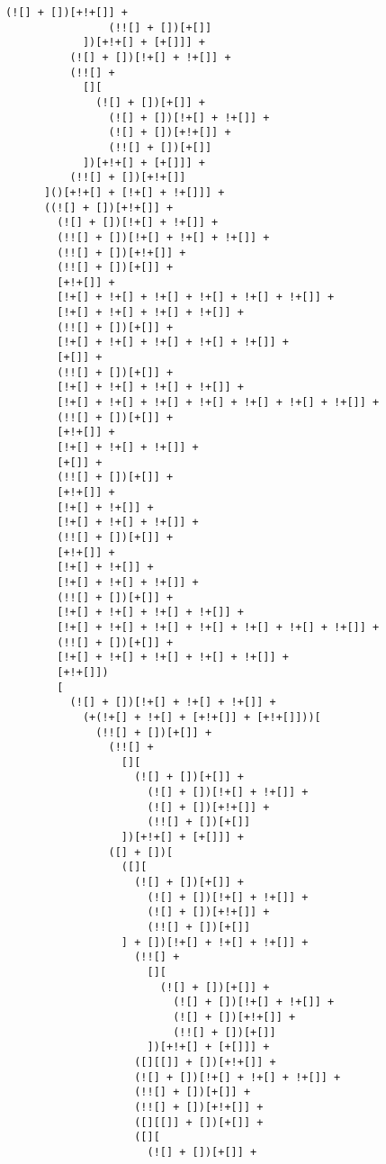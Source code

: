\begin{lstlisting}[style=basicStyle, caption=alert('XSS') in JSFuck, label={lst:alertxssjsfuck}]
                (![] + [])[+!+[]] +
                (!![] + [])[+[]]
            ])[+!+[] + [+[]]] +
          (![] + [])[!+[] + !+[]] +
          (!![] +
            [][
              (![] + [])[+[]] +
                (![] + [])[!+[] + !+[]] +
                (![] + [])[+!+[]] +
                (!![] + [])[+[]]
            ])[+!+[] + [+[]]] +
          (!![] + [])[+!+[]]
      ]()[+!+[] + [!+[] + !+[]]] +
      ((![] + [])[+!+[]] +
        (![] + [])[!+[] + !+[]] +
        (!![] + [])[!+[] + !+[] + !+[]] +
        (!![] + [])[+!+[]] +
        (!![] + [])[+[]] +
        [+!+[]] +
        [!+[] + !+[] + !+[] + !+[] + !+[] + !+[]] +
        [!+[] + !+[] + !+[] + !+[]] +
        (!![] + [])[+[]] +
        [!+[] + !+[] + !+[] + !+[] + !+[]] +
        [+[]] +
        (!![] + [])[+[]] +
        [!+[] + !+[] + !+[] + !+[]] +
        [!+[] + !+[] + !+[] + !+[] + !+[] + !+[] + !+[]] +
        (!![] + [])[+[]] +
        [+!+[]] +
        [!+[] + !+[] + !+[]] +
        [+[]] +
        (!![] + [])[+[]] +
        [+!+[]] +
        [!+[] + !+[]] +
        [!+[] + !+[] + !+[]] +
        (!![] + [])[+[]] +
        [+!+[]] +
        [!+[] + !+[]] +
        [!+[] + !+[] + !+[]] +
        (!![] + [])[+[]] +
        [!+[] + !+[] + !+[] + !+[]] +
        [!+[] + !+[] + !+[] + !+[] + !+[] + !+[] + !+[]] +
        (!![] + [])[+[]] +
        [!+[] + !+[] + !+[] + !+[] + !+[]] +
        [+!+[]])
        [
          (![] + [])[!+[] + !+[] + !+[]] +
            (+(!+[] + !+[] + [+!+[]] + [+!+[]]))[
              (!![] + [])[+[]] +
                (!![] +
                  [][
                    (![] + [])[+[]] +
                      (![] + [])[!+[] + !+[]] +
                      (![] + [])[+!+[]] +
                      (!![] + [])[+[]]
                  ])[+!+[] + [+[]]] +
                ([] + [])[
                  ([][
                    (![] + [])[+[]] +
                      (![] + [])[!+[] + !+[]] +
                      (![] + [])[+!+[]] +
                      (!![] + [])[+[]]
                  ] + [])[!+[] + !+[] + !+[]] +
                    (!![] +
                      [][
                        (![] + [])[+[]] +
                          (![] + [])[!+[] + !+[]] +
                          (![] + [])[+!+[]] +
                          (!![] + [])[+[]]
                      ])[+!+[] + [+[]]] +
                    ([][[]] + [])[+!+[]] +
                    (![] + [])[!+[] + !+[] + !+[]] +
                    (!![] + [])[+[]] +
                    (!![] + [])[+!+[]] +
                    ([][[]] + [])[+[]] +
                    ([][
                      (![] + [])[+[]] +

\end{lstlisting}
